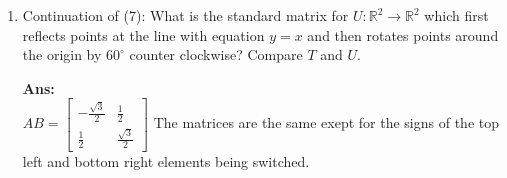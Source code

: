 \documentclass[12pt,a4paper]{amsart}
\newcommand{\R}{\mathbb{R}}
\newcommand\sol[1]{
\medskip
\begin{mdframed}
\textbf{Ans:\\} #1
\end{mdframed}
\medskip
}
\begin{document}
\begin{enumerate}
\sol{
  \begin{enumerate}
    \item
      $A=\left[\begin{matrix} \frac{1}{2} & -\frac{\sqrt3}{2} \\ \frac{\sqrt3}{2} & \frac{1}{2} \end{matrix}\right]$
    \item
      $B=\left[\begin{matrix} 0 & 1 \\ 1 & 0 \end{matrix}\right]$
    \item
      $BA=\left[\begin{matrix} \frac{\sqrt3}{2}&\frac{1}{2} \\  \frac{1}{2}&-\frac{\sqrt3}{2} \end{matrix}\right]$
  \end{enumerate}
}
\item
 Continuation of (7): What is the standard matrix for $U\colon\R^2\to\R^2$ which first reflects
 points at the line with equation $y=x$ and then rotates points around the origin by $60^\circ$ counter clockwise?
 Compare $T$ and $U$.
 \sol{
  $AB=\left[\begin{matrix} -\frac{\sqrt3}{2}&\frac{1}{2} \\  \frac{1}{2}&\frac{\sqrt3}{2} \end{matrix}\right]$
  The matrices are the same exept for the signs of the top left and bottom right elements being switched.
 }
\end{enumerate}

\end{document}
